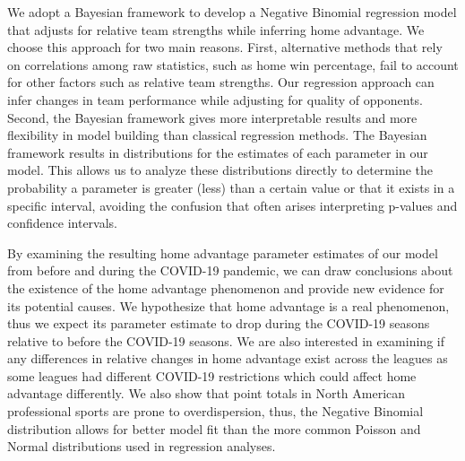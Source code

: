 We adopt a Bayesian framework to develop a Negative Binomial regression model that adjusts for relative team strengths while inferring home advantage. We choose this approach for two main reasons. First, alternative methods that rely on correlations among raw statistics, such as home win percentage, fail to account for other factors such as relative team strengths. Our regression approach can infer changes in team performance while adjusting for quality of opponents. Second, the Bayesian framework gives more interpretable results and more flexibility in model building than classical regression methods. The Bayesian framework results in distributions for the estimates of each parameter in our model. This allows us to analyze these distributions directly to determine the probability a parameter is greater (less) than a certain value or that it exists in a specific interval, avoiding the confusion that often arises interpreting p-values and confidence intervals.

By examining the resulting home advantage parameter estimates of our model from before and during the COVID-19 pandemic, we can draw conclusions about the existence of the home advantage phenomenon and provide new evidence for its potential causes. We hypothesize that home advantage is a real phenomenon, thus we expect its parameter estimate to drop during the COVID-19 seasons relative to before the COVID-19 seasons. We are also interested in examining if any differences in relative changes in home advantage exist across the leagues as some leagues had different COVID-19 restrictions which could affect home advantage differently. We also show that point totals in North American professional sports are prone to overdispersion, thus, the Negative Binomial distribution allows for better model fit than the more common Poisson and Normal distributions used in regression analyses.
